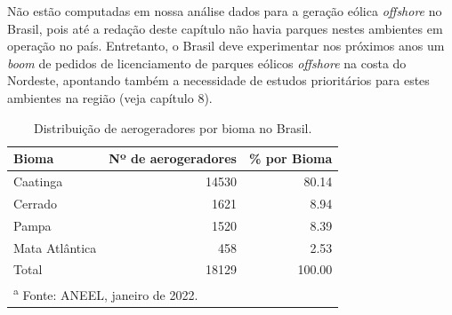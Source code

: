 \documentclass[
  oneside]{scrbook}
\begin{document}
Não estão computadas em nossa análise dados para a geração eólica \emph{offshore} no Brasil, pois até a redação deste capítulo não havia parques nestes ambientes em operação no país. Entretanto, o Brasil deve experimentar nos próximos anos um \emph{boom} de pedidos de licenciamento de parques eólicos \emph{offshore} na costa do Nordeste, apontando também a necessidade de estudos prioritários para estes ambientes na região (veja capítulo 8).

\begin{longtable}[t]{>{}lrr}
\caption{\label{tab:tab09}Distribuição de aerogeradores por bioma no Brasil.}\\
\toprule
Bioma & Nº de aerogeradores & \% por Bioma\\
\midrule
Caatinga & 14530 & 80.14\\
Cerrado & 1621 & 8.94\\
Pampa & 1520 & 8.39\\
Mata Atlântica & 458 & 2.53\\
Total & 18129 & 100.00\\
\bottomrule
\multicolumn{3}{l}{\rule{0pt}{1em}\textsuperscript{a} Fonte: ANEEL, janeiro de 2022.}\\
\end{longtable}
\end{document}
